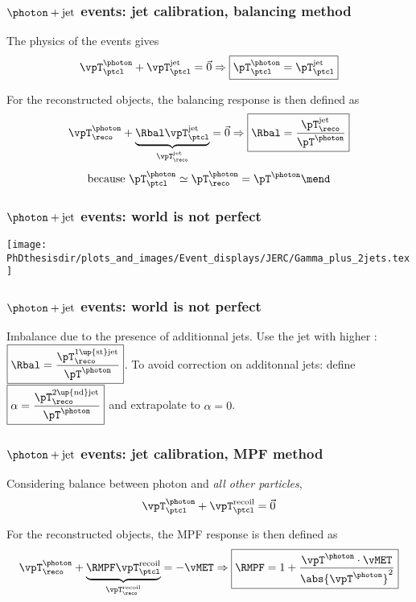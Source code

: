 \begin{frame}
\frametitle{$\photon+\text{jet}$ events: jet calibration, balancing method}
\manip The physics of the events gives
\begin{equation*}
\vpT^\photon_\ptcl + \vpT^\text{jet}_\ptcl = \vec{0} \Rightarrow \boxed{{\pT}^\photon_\ptcl = {\pT}^\text{jet}_\ptcl}
\end{equation*}

\pause
\vfill

\manip For the reconstructed objects, the balancing response is then defined as
\begin{equation*}
\vpT^\photon_\reco + \underbrace{\Rbal \vpT^\text{jet}_\ptcl}_{\vpT^\text{jet}_\reco} = \vec{0}
\Rightarrow
\boxed{\Rbal = \frac{{\pT}^\text{jet}_\reco}{\pT^\photon}}
\end{equation*}
\begin{equation*}
\text{because }
\pT^\photon_\ptcl\simeq\pT^\photon_\reco
=\pT^\photon
\mend
\end{equation*}
\end{frame}

\begin{frame}
\frametitle{$\photon+\text{jet}$ events: world is not perfect}
\begin{center}
\texttt{[image: \\PhDthesisdir/plots\_and\_images/Event\_displays/JERC/Gamma\_plus\_2jets.tex]}
\end{center}
\end{frame}

\begin{frame}
\frametitle{$\photon+\text{jet}$ events: world is not perfect}
\manip Imbalance due to the presence of additionnal jets.
\pause
\manip Use the jet with higher \pT: $\displaystyle \boxed{\Rbal = \frac{{\pT}^\text{1\up{st}jet}_\reco}{\pT^\photon}}$.
\pause
\manip To avoid correction on additonnal jets: define $\displaystyle \boxed{\alpha = \frac{{\pT}^\text{2\up{nd}jet}_\reco}{\pT^\photon}}$ and extrapolate to $\alpha=0$.
\end{frame}

\begin{frame}
\frametitle{$\photon+\text{jet}$ events: jet calibration, MPF method}
\manip Considering balance between photon and \emph{all other particles},
\begin{equation*}
\vpT^\photon_\ptcl + \vpT^\text{recoil}_\ptcl = \vec{0}
\end{equation*}

\pause
\vfill

\manip For the reconstructed objects, the MPF response is then defined as
\begin{equation*}
\vpT^\photon_\reco + \underbrace{\RMPF \vpT^\text{recoil}_\ptcl}_{\vpT^\text{recoil}_\reco} = -\vMET
\Rightarrow
\boxed{\RMPF = 1 + \frac{\vpT^\photon\cdot\vMET}{\abs{\vpT^\photon}^2}}
\end{equation*}
\end{frame}